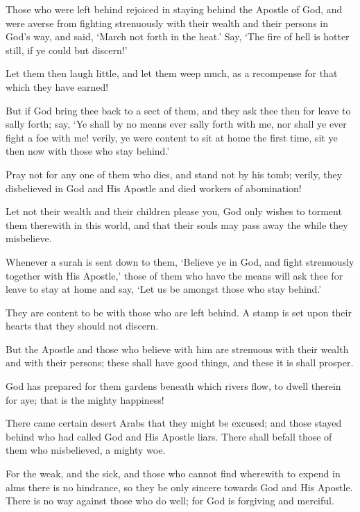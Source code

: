 \documentclass[fontsize=14pt, letterpaper, notitlepage, openany, DIV=12]{scrbook} %
\begin{document}
\noindent[9:81]
Those who were left behind rejoiced in staying behind the Apostle of God, and were
averse from fighting strenuously with their wealth and their persons in God's way, and said,
`March not forth in the heat.' Say, `The fire of hell is hotter still, if ye could but discern!'

\noindent[9:82]
Let them then laugh little, and let them weep much, as a recompense for that which they
have earned!

\noindent[9:83]
But if God bring thee back to a sect of them, and they ask thee then for leave to sally
forth; say, `Ye shall by no means ever sally forth with me, nor shall ye ever fight a foe with me!
verily, ye were content to sit at home the first time, sit ye then now with those who stay behind.'

\noindent[9:84]
Pray not for any one of them who dies, and stand not by his tomb; verily, they
disbelieved in God and His Apostle and died workers of abomination!

\noindent[9:85]
Let not their wealth and their children please you, God only wishes to torment them
therewith in this world, and that their souls may pass away the while they misbelieve.

\noindent[9:86]
Whenever a surah is sent down to them, `Believe ye in God, and fight strenuously
together with His Apostle,' those of them who have the means will ask thee for leave to stay at
home and say, `Let us be amongst those who stay behind.'

\noindent[9:87]
They are content to be with those who are left behind. A stamp is set upon their hearts
that they should not discern.

\noindent[9:88]
But the Apostle and those who believe with him are strenuous with their wealth and with
their persons; these shall have good things, and these it is shall prosper.

\noindent[9:89]
God has prepared for them gardens beneath which rivers flow, to dwell therein for aye;
that is the mighty happiness!

\noindent[9:90]
There came certain desert Arabs that they might be excused; and those stayed behind who
had called God and His Apostle liars. There shall befall those of them who misbelieved, a mighty
woe.

\noindent[9:91]
For the weak, and the sick, and those who cannot find wherewith to expend in alms there
is no hindrance, so they be only sincere towards God and His Apostle. There is no way against
those who do well; for God is forgiving and merciful.
\end{document}
